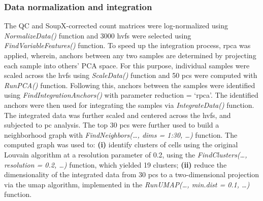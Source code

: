 \subsubsection{\large Data normalization and integration}
The QC and SoupX-corrected count matrices were log-normalized using \textit{NormalizeData()} function and 3000 \glspl{hvf} were selected using \textit{FindVariableFeatures()} function. To speed up the integration process, \gls{rpca} was applied, wherein, anchors between any two samples are determined by projecting each sample into others’ PCA space. For this purpose, individual samples were scaled across the \glspl{hvf} using \textit{ScaleData()} function and 50 \glspl{pc} were computed with \textit{RunPCA()} function. Following this, anchors between the samples were identified using \textit{FindIntegrationAnchors()} with parameter reduction = ‘rpca’. The identified anchors were then used for integrating the samples via \textit{IntegrateData()} function. The integrated data was further scaled and centered across the \glspl{hvf}, and subjected to \gls{pc} analysis. The top 30 \glspl{pc} were further used to build a neighborhood graph with \textit{FindNeighbors(…, dims = 1:30, …)} function. The computed graph was used to: \textbf{(i)} identify clusters of cells using the original Louvain algorithm at a resolution parameter of 0.2, using the \textit{FindClusters(…, resolution = 0.2, …)} function, which yielded 19 clusters; \textbf{(ii)} reduce the dimensionality of the integrated data from 30 \glspl{pc} to a two-dimensional projection via the \gls{umap} algorithm, implemented in the \textit{RunUMAP(…, min.dist = 0.1, …)} function.  


